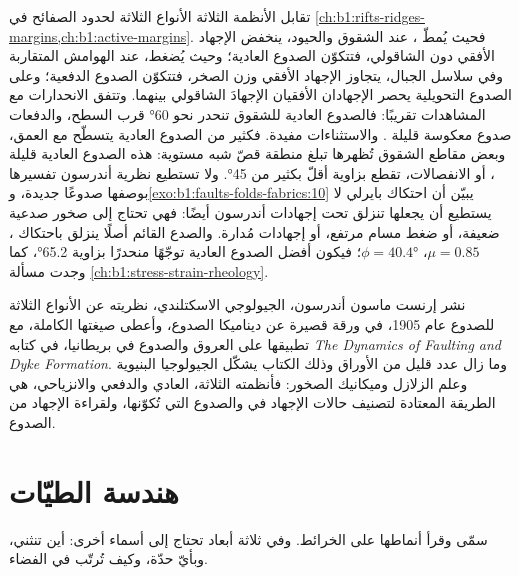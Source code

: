 تقابل الأنظمة الثلاثة الأنواع الثلاثة لحدود الصفائح في \cref{ch:b1:rifts-ridges-margins,ch:b1:active-margins}. فحيث يُمطّ ، عند الشقوق والحيود، ينخفض الإجهاد الأفقي دون الشاقولي، فتتكوّن الصدوع العادية؛ وحيث يُضغط، عند الهوامش المتقاربة وفي سلاسل الجبال، يتجاوز الإجهاد الأفقي وزن الصخر، فتتكوّن الصدوع الدفعية؛ وعلى الصدوع التحويلية يحصر الإجهادان الأفقيان الإجهادَ الشاقولي بينهما.
وتتفق الانحدارات مع المشاهدات تقريبًا: فالصدوع العادية للشقوق تنحدر نحو \ang{60} قرب السطح، والدفعات صدوع معكوسة قليلة . والاستثناءات مفيدة. فكثير من الصدوع العادية يتسطّح مع العمق، وبعض مقاطع الشقوق تُظهرها تبلغ منطقة قصّ شبه مستوية: هذه الصدوع العادية قليلة ، أو الانفصالات، تقطع  بزاوية أقلّ بكثير من \ang{45}. ولا تستطيع نظرية أندرسون تفسيرها بوصفها صدوعًا جديدة،
و\cref{exo:b1:faults-folds-fabrics:10} يبيّن أن احتكاك بايرلي لا يستطيع أن يجعلها تنزلق تحت إجهادات أندرسون أيضًا: فهي تحتاج إلى صخور صدعية ضعيفة، أو ضغط مسام مرتفع، أو إجهادات مُدارة. والصدع القائم أصلًا ينزلق باحتكاك ، $\mu = 0.85$، $\phi = \ang{40.4}$؛ فيكون أفضل الصدوع العادية توجّهًا منحدرًا بزاوية \ang{65.2}، كما وجدت مسألة \cref{ch:b1:stress-strain-rheology}.

\begin{history}
نشر إرنست ماسون أندرسون، الجيولوجي الاسكتلندي، نظريته عن الأنواع الثلاثة للصدوع عام 1905، في ورقة قصيرة عن ديناميكا الصدوع، وأعطى صيغتها الكاملة، مع تطبيقها على العروق والصدوع في بريطانيا، في كتابه \emph{The Dynamics of Faulting and Dyke Formation}. وما زال عدد قليل من الأوراق وذلك الكتاب يشكّل الجيولوجيا البنيوية وعلم الزلازل وميكانيك الصخور: فأنظمته الثلاثة، العادي والدفعي والانزياحي، هي الطريقة المعتادة لتصنيف حالات الإجهاد في  والصدوع التي تُكوّنها، ولقراءة الإجهاد من الصدوع.
\end{history}

\section{هندسة الطيّات}\label{sec:b1:faults-folds-fabrics:folds}

 سمّى  وقرأ أنماطها على الخرائط. وفي ثلاثة أبعاد تحتاج  إلى أسماء أخرى: أين تنثني، وبأيّ حدّة، وكيف تُرتّب في الفضاء.

